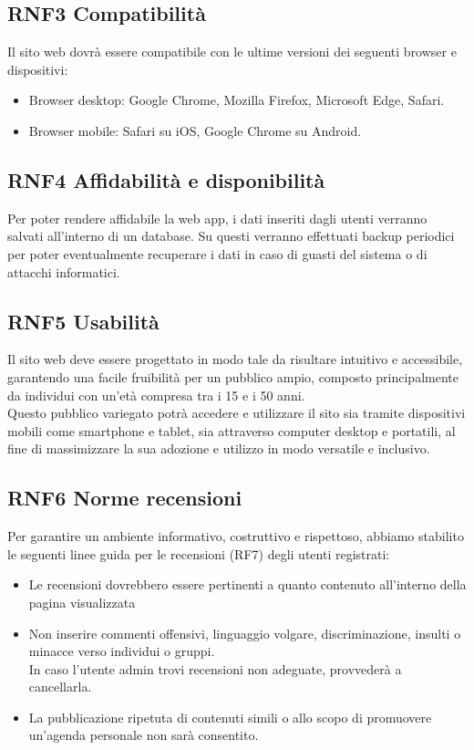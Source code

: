 \documentclass[a4paper,12pt]{article}
\begin{document}
\subsection*{RNF3 Compatibilità}
Il sito web dovrà essere compatibile con le ultime versioni dei seguenti browser e dispositivi:
\begin{itemize}
    \item Browser desktop: Google Chrome, Mozilla Firefox, Microsoft Edge, Safari.
    \item Browser mobile: Safari su iOS, Google Chrome su Android.
\end{itemize}


\subsection*{RNF4 Affidabilità e disponibilità}
Per poter rendere affidabile la web app, i dati inseriti dagli utenti verranno salvati all’interno di un database. Su questi verranno effettuati backup periodici per poter eventualmente recuperare i dati in caso di guasti del sistema o di attacchi informatici.


\subsection*{RNF5 Usabilità}
Il sito web deve essere progettato in modo tale da risultare intuitivo e accessibile, garantendo una facile fruibilità per un pubblico ampio, composto principalmente da individui con un'età compresa tra i 15 e i 50 anni.\\
Questo pubblico variegato potrà accedere e utilizzare il sito sia tramite dispositivi mobili come smartphone e tablet, sia attraverso computer desktop e portatili, al fine di massimizzare la sua adozione e utilizzo in modo versatile e inclusivo.


\subsection*{RNF6 Norme recensioni}
Per garantire un ambiente informativo, costruttivo e rispettoso, abbiamo stabilito le seguenti linee guida per le recensioni (RF7) degli utenti registrati:
\begin{itemize}
    \item Le recensioni dovrebbero essere pertinenti a quanto contenuto all'interno della pagina visualizzata
    \item Non inserire commenti offensivi, linguaggio volgare, discriminazione, insulti o minacce verso individui o gruppi.\\
    In caso l'utente admin trovi recensioni non adeguate, provvederà a cancellarla.
    \item La pubblicazione ripetuta di contenuti simili o allo scopo di promuovere un'agenda personale non sarà consentito.
\end{itemize}
\end{document}
